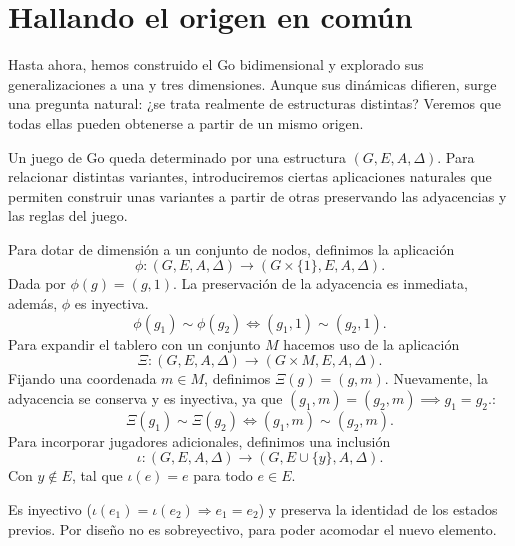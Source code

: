 \section{Hallando el origen en común}

Hasta ahora, hemos construido el Go bidimensional y explorado sus generalizaciones a una y tres dimensiones. Aunque sus dinámicas difieren, surge una pregunta natural: ¿se trata realmente de estructuras distintas? Veremos que todas ellas pueden obtenerse a partir de un mismo origen.

Un juego de Go queda determinado por una estructura $(G,E,A,\Delta)$. Para relacionar distintas variantes, introduciremos ciertas aplicaciones naturales que permiten construir unas variantes a partir de otras preservando las adyacencias y las reglas del juego.

Para dotar de dimensión a un conjunto de nodos, definimos la aplicación
$$\phi:(G,E,A,\Delta)\to(G\times\{1\},E,A,\Delta).$$
Dada por $\phi(g)=(g,1)$.
La preservación de la adyacencia es inmediata, además, $\phi$ es inyectiva.
$$\phi(g_1)\sim\phi(g_2)\iff(g_1,1)\sim(g_2,1).$$
Para expandir el tablero con un conjunto $M$ hacemos uso de la aplicación
$$\Xi:(G,E,A,\Delta)\to(G\times M,E,A,\Delta).$$
Fijando una coordenada $m \in M$, definimos $\Xi(g) = (g,m)$. Nuevamente, la adyacencia se conserva y es inyectiva, ya que $(g_1,m) = (g_2,m) \implies g_1 = g_2$.:
$$\Xi(g_1) \sim \Xi(g_2) \iff (g_1,m) \sim (g_2,m).$$
Para incorporar jugadores adicionales, definimos una inclusión $$\iota: (G,E,A,\Delta) \to (G,E \cup \{y\},A,\Delta).$$ Con $y \notin E$, tal que $\iota(e) = e$ para todo $e \in E$. 

Es inyectivo ($\iota(e_1) = \iota(e_2) \Rightarrow e_1 = e_2$) y preserva la identidad de los estados previos. Por diseño no es sobreyectivo, para poder acomodar el nuevo elemento.


